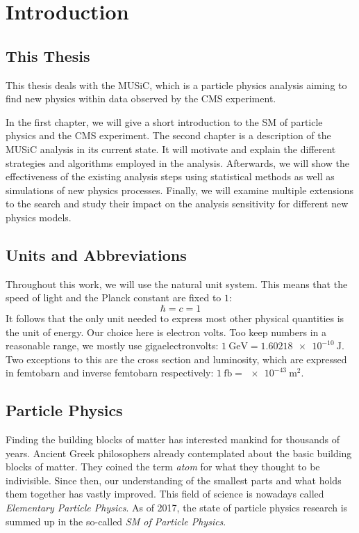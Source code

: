 
\chapter{Introduction}

\section{This Thesis}
This thesis deals with the \acf{MUSiC}, which is a particle physics analysis aiming to find new physics within data observed by the \acs{CMS} experiment.

In the first chapter, we will give a short introduction to the \acl{SM} of particle physics and the \acs{CMS} experiment. 
The second chapter is a description of the \acs{MUSiC} analysis in its current state. It will motivate and explain the different strategies and algorithms employed in the analysis.
Afterwards, we will show the effectiveness of the existing analysis steps using statistical methods as well as simulations of new physics processes.
Finally, we will examine multiple extensions to the search and study their impact on the analysis sensitivity for different new physics models.


\section{Units and Abbreviations}
Throughout this work, we will use the natural unit system. This means that the speed of light and the Planck constant are fixed to $1$:
\begin{equation*}
    \hbar = c = 1
\end{equation*}
It follows that the only unit needed to express most other physical quantities is the unit of energy. Our choice here is electron volts. Too keep numbers in a reasonable range, we mostly use gigaelectronvolts: $\SI{1}{\giga\eV} = \SI{1.60218e-10}{\joule}$.
Two exceptions to this are the cross section and luminosity, which are expressed in femtobarn and inverse femtobarn respectively: $\SI{1}{\femto\barn} = \SI{e-43}{\meter\squared}$.

\section{Particle Physics}
Finding the building blocks of matter has interested mankind for thousands of years. Ancient Greek philosophers already contemplated about the basic building blocks of matter. They coined the term \emph{atom} for what they thought to be indivisible. Since then, our understanding of the smallest parts and what holds them together has vastly improved. This field of science is nowadays called \emph{Elementary Particle Physics}. As of 2017, the state of particle physics research is summed up in the so-called \emph{\acl{SM} of Particle Physics}.

